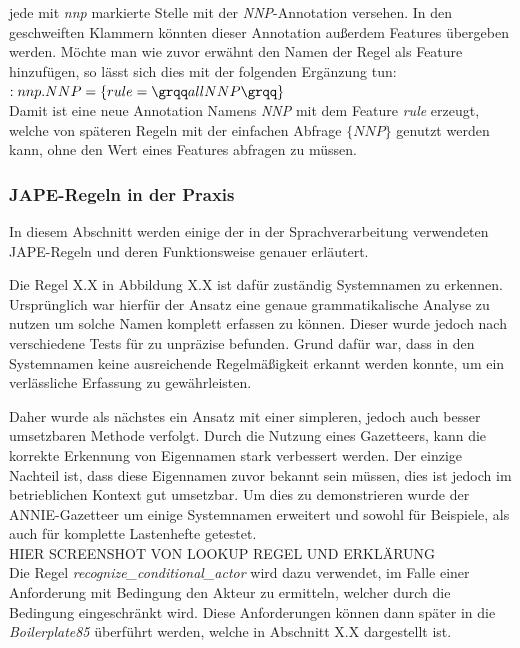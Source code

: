 \documentclass[12pt]{report}
\begin{document}
jede mit \textit{nnp} markierte Stelle mit der \textit{NNP}-Annotation versehen. In den geschweiften Klammern könnten dieser Annotation außerdem Features übergeben werden. Möchte man wie zuvor erwähnt den Namen der Regel als Feature hinzufügen, so lässt sich dies mit der folgenden Ergänzung tun:\\

$:nnp.NNP=\{rule=\grqq allNNP\grqq \}$\\

Damit ist eine neue Annotation Namens \textit{NNP} mit dem Feature \textit{rule} erzeugt, welche von späteren Regeln mit der einfachen Abfrage $\{NNP\}$ genutzt werden kann, ohne den Wert eines Features abfragen zu müssen.

\subsubsection{JAPE-Regeln in der Praxis}
In diesem Abschnitt werden einige der in der Sprachverarbeitung verwendeten JAPE-Regeln und deren Funktionsweise genauer erläutert. 

Die Regel X.X in Abbildung X.X ist dafür zuständig Systemnamen zu erkennen. Ursprünglich war hierfür der Ansatz eine genaue grammatikalische Analyse zu nutzen um solche Namen komplett erfassen zu können. Dieser wurde jedoch nach verschiedene Tests für zu unpräzise befunden. Grund dafür war, dass in den Systemnamen keine ausreichende Regelmäßigkeit erkannt werden konnte, um ein verlässliche Erfassung zu gewährleisten. 

Daher wurde als nächstes ein Ansatz mit einer simpleren, jedoch auch besser umsetzbaren Methode verfolgt. Durch die Nutzung eines Gazetteers, kann die korrekte Erkennung von Eigennamen stark verbessert werden. Der einzige Nachteil ist, dass diese Eigennamen zuvor bekannt sein müssen, dies ist jedoch im betrieblichen Kontext gut umsetzbar. Um dies zu demonstrieren wurde der ANNIE-Gazetteer um einige Systemnamen erweitert und sowohl für Beispiele, als auch für komplette Lastenhefte getestet. \\

HIER SCREENSHOT VON LOOKUP REGEL UND ERKLÄRUNG\\

Die Regel \textit{recognize\_conditional\_actor} wird dazu verwendet, im Falle einer Anforderung mit Bedingung den Akteur zu ermitteln, welcher durch die Bedingung eingeschränkt wird. Diese Anforderungen können dann später in die \textit{Boilerplate85} überführt werden, welche in Abschnitt X.X dargestellt ist. 
\end{document}
